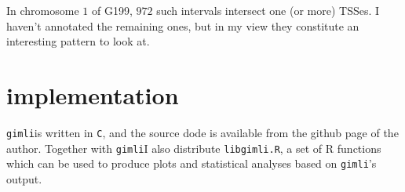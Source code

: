 \documentclass[11pt]{amsart}
\newcommand{\gimli}{\texttt{gimli}}
\begin{document}
In chromosome $1$ of G199, $972$ such intervals intersect one (or more) 
TSSes. I haven't annotated the remaining ones, but in my view they constitute
an interesting pattern to look at.

\section{implementation}

\gimli is written in \texttt{C}, and the source
dode is available from the github page of the author. Together
with \gimli I also distribute \texttt{libgimli.R},
a set of R functions which can be used to produce plots and statistical
analyses based on \gimli's output.



\end{document}
